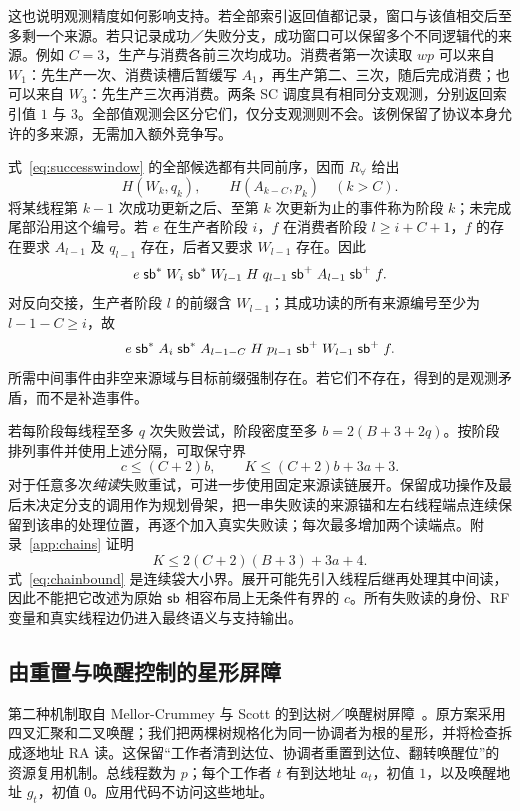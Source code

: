 这也说明观测精度如何影响支持。若全部索引返回值都记录，窗口与该值相交后至多剩一个来源。若只记录成功／失败分支，成功窗口可以保留多个不同逻辑代的来源。例如 $C=3$，生产与消费各前三次均成功。消费者第一次读取 $wp$ 可以来自 $W_1$：先生产一次、消费读槽后暂缓写 $A_1$，再生产第二、三次，随后完成消费；也可以来自 $W_3$：先生产三次再消费。两条 SC 调度具有相同分支观测，分别返回索引值 $1$ 与 $3$。全部值观测会区分它们，仅分支观测则不会。该例保留了协议本身允许的多来源，无需加入额外竞争写。

式~\eqref{eq:successwindow} 的全部候选都有共同前序，因而 $R_\forall$ 给出
\begin{equation}\label{eq:handoff}
 H(W_k,q_k),\qquad H(A_{k-C},p_k)\quad(k>C).
\end{equation}
将某线程第 $k-1$ 次成功更新之后、至第 $k$ 次更新为止的事件称为阶段 $k$；未完成尾部沿用这个编号。若 $e$ 在生产者阶段 $i$，$f$ 在消费者阶段 $l\ge i+C+1$，$f$ 的存在要求 $A_{l-1}$ 及 $q_{l-1}$ 存在，后者又要求 $W_{l-1}$ 存在。因此
\[
 e\mathrel{\mathsf{sb}^*}W_i\mathrel{\mathsf{sb}^*}W_{l-1}
 \mathrel H q_{l-1}\mathrel{\mathsf{sb}^+}A_{l-1}\mathrel{\mathsf{sb}^+}f.
\]
对反向交接，生产者阶段 $l$ 的前缀含 $W_{l-1}$；其成功读的所有来源编号至少为 $l-1-C\ge i$，故
\[
 e\mathrel{\mathsf{sb}^*}A_i\mathrel{\mathsf{sb}^*}A_{l-1-C}
 \mathrel H p_{l-1}\mathrel{\mathsf{sb}^+}W_{l-1}\mathrel{\mathsf{sb}^+}f.
\]
所需中间事件由非空来源域与目标前缀强制存在。若它们不存在，得到的是观测矛盾，而不是补造事件。

若每阶段每线程至多 $q$ 次失败尝试，阶段密度至多 $b=2(B+3+2q)$。按阶段排列事件并使用上述分隔，可取保守界
\begin{equation}\label{eq:bufferbound}
 c\le(C+2)b,\qquad K\le(C+2)b+3a+3.
\end{equation}
对于任意多次\emph{纯读}失败重试，可进一步使用固定来源读链展开。保留成功操作及最后未决定分支的调用作为规划骨架，把一串失败读的来源锚和左右线程端点连续保留到该串的处理位置，再逐个加入真实失败读；每次最多增加两个读端点。附录~\ref{app:chains} 证明
\begin{equation}\label{eq:chainbound}
 K\le 2(C+2)(B+3)+3a+4.
\end{equation}
式~\eqref{eq:chainbound} 是连续袋大小界。展开可能先引入线程后继再处理其中间读，因此不能把它改述为原始 $\mathsf{sb}$ 相容布局上无条件有界的 $c$。所有失败读的身份、RF 变量和真实线程边仍进入最终语义与支持输出。

\subsection{由重置与唤醒控制的星形屏障}\label{sec:barrier}
第二种机制取自 Mellor-Crummey 与 Scott 的到达树／唤醒树屏障~\cite{mcs1991}。原方案采用四叉汇聚和二叉唤醒；我们把两棵树规格化为同一协调者为根的星形，并将检查拆成逐地址 RA 读。这保留“工作者清到达位、协调者重置到达位、翻转唤醒位”的资源复用机制。总线程数为 $p$；每个工作者 $t$ 有到达地址 $a_t$，初值 $1$，以及唤醒地址 $g_t$，初值 $0$。应用代码不访问这些地址。

